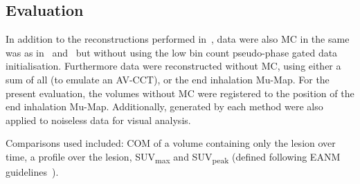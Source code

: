     
    \subsection{Evaluation} \label{sec:evaluation}
        In addition to the reconstructions performed in~, data were also \gls{MC} in the same was as in~ and~ but without using the low bin count pseudo-phase gated data initialisation. Furthermore data were reconstructed without \gls{MC}, using either a sum of all  (to emulate an \gls{AV-CCT}), or the end inhalation \gls{Mu-Map}. For the present evaluation, the volumes without \gls{MC} were registered to the position of the end inhalation \gls{Mu-Map}. Additionally,  generated by each method were also applied to noiseless data for visual analysis.
        
        Comparisons used included: \gls{COM} of a volume containing only the lesion over time, a profile over the lesion, \gls{SUV}\textsubscript{max} and \gls{SUV}\textsubscript{peak} (defined following \gls{EANM} guidelines~\cite{Boellaard2015FDG2.0}).


